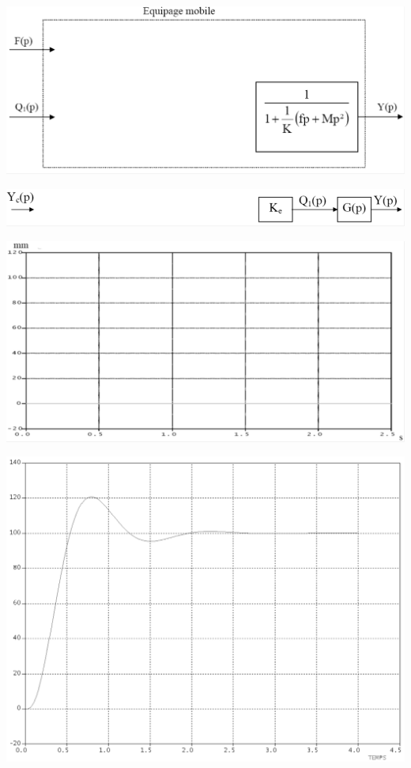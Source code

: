 \documentclass[10pt,oneside]{article}
\begin{document}
{\begin{center}
\includegraphics[width=.75\textwidth]{png/fig10}
\end{center}


\begin{center}
\includegraphics[width=.75\textwidth]{png/fig11}
\end{center}

\begin{center}
\includegraphics[width=.75\textwidth]{png/fig12}
\end{center}

\begin{center}
\includegraphics[width=.75\textwidth]{png/fig13}
\end{center}
}
\end{document}
